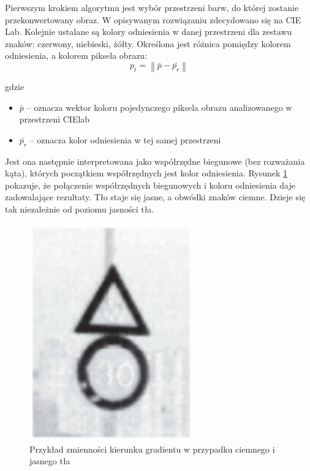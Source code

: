 Pierwszym krokiem algorytmu jest wybór przestrzeni barw, do której zostanie przekonwertowany obraz. 
W opisywanym rozwiązaniu zdecydowano się na CIE Lab. 
Kolejnie ustalane są kolory odniesienia w danej przestrzeni dla zestawu znaków: czerwony, niebieski, żółty.
Określona jest różnica pomiędzy kolorem odniesienia, a kolorem piksela obrazu:
\begin{equation}
p_t=\left \| \bar{p} - \bar{p_r} \right \|
\end{equation}

gdzie
\begin{itemize}
\item{$\bar{p}$ -- oznacza wektor koloru pojedynczego piksela obrazu analizowanego w przestrzeni CIElab}
\item{$\bar{p_r}$ -- oznacza kolor odniesienia w tej samej przestrzeni}
\end{itemize}

Jest ona następnie interpretowana jako współrzędne biegunowe (bez rozważania kąta), których początkiem współrzędnych jest kolor odniesienia. 
Rysunek \ref{fig:sign_detection2_result} pokazuje, że połączenie współrzędnych biegunowych i koloru odniesienia daje zadowalające rezultaty. 
Tło staje się jasne, a obwódki znaków ciemne. 
Dzieje się tak niezależnie od poziomu jasności tła.

\begin{figure}
  \centering
  \includegraphics[width=7cm]{img/sign_detection2_result.png}
  \caption{Przykład zmienności kierunku gradientu w przypadku ciemnego i jasnego tła\cite{T7}}
  \label{fig:sign_detection2_result}
\end{figure}

